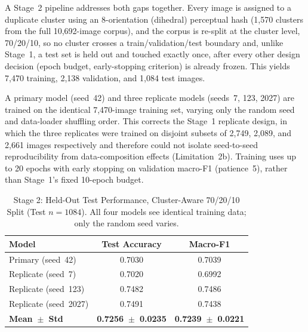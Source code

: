 A Stage~2 pipeline addresses both gaps together. Every image is assigned to a duplicate cluster using an 8-orientation (dihedral) perceptual hash (1,570 clusters from the full 10,692-image corpus), and the corpus is re-split at the cluster level, 70/20/10, so no cluster crosses a train/validation/test boundary and, unlike Stage~1, a test set is held out and touched exactly once, after every other design decision (epoch budget, early-stopping criterion) is already frozen. This yields 7,470 training, 2,138 validation, and 1,084 test images.

A primary model (seed~42) and three replicate models (seeds~7, 123, 2027) are trained on the identical 7,470-image training set, varying only the random seed and data-loader shuffling order. This corrects the Stage~1 replicate design, in which the three replicates were trained on disjoint subsets of 2,749, 2,089, and 2,661 images respectively and therefore could not isolate seed-to-seed reproducibility from data-composition effects (Limitation~2b). Training uses up to 20 epochs with early stopping on validation macro-F1 (patience~5), rather than Stage~1's fixed 10-epoch budget.

\begin{table}[!ht]
\centering
\caption{Stage 2: Held-Out Test Performance, Cluster-Aware 70/20/10 Split (Test $n=1084$). All four models see identical training data; only the random seed varies.}
\label{tbl:stage2-test}
\begin{tabular}{lcc}
\toprule
Model & Test Accuracy & Macro-F1 \\
\midrule
Primary (seed~42) & 0.7030 & 0.7039 \\
Replicate (seed~7) & 0.7020 & 0.6992 \\
Replicate (seed~123) & 0.7482 & 0.7486 \\
Replicate (seed~2027) & 0.7491 & 0.7438 \\
\midrule
\textbf{Mean~$\pm$~Std} & \textbf{0.7256~$\pm$~0.0235} & \textbf{0.7239~$\pm$~0.0221} \\
\bottomrule
\end{tabular}
\end{table}

